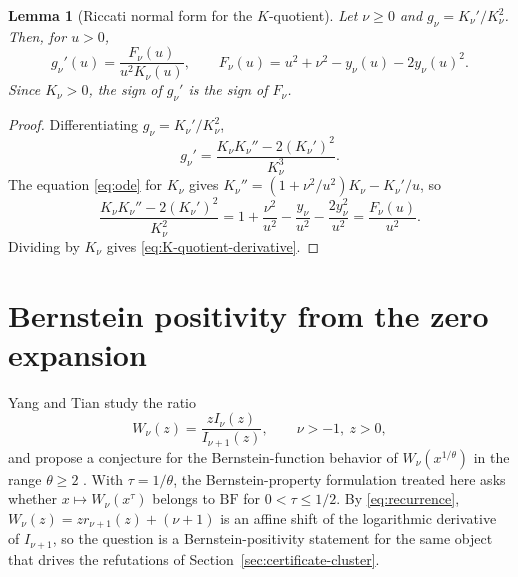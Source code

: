 \documentclass[preprint,12pt]{elsarticle}
\theoremstyle{plain}
\newtheorem{lemma}[theorem]{Lemma}
\theoremstyle{definition}
\theoremstyle{remark}
\newcommand{\BF}{\mathrm{BF}}
\begin{document}
\begin{lemma}[Riccati normal form for the \(K\)-quotient]\label{lem:riccati-K}
Let \(\nu\ge0\) and \(g_\nu=K_\nu'/K_\nu^2\). Then, for \(u>0\),
\begin{equation}\label{eq:K-quotient-derivative}
g_\nu'(u)=\frac{F_\nu(u)}{u^2K_\nu(u)},
\qquad
F_\nu(u)=u^2+\nu^2-y_\nu(u)-2y_\nu(u)^2.
\end{equation}
Since \(K_\nu>0\), the sign of \(g_\nu'\) is the sign of \(F_\nu\).
\end{lemma}
\begin{proof}
Differentiating \(g_\nu=K_\nu'/K_\nu^2\),
\begin{equation}
g_\nu'=\frac{K_\nu K_\nu''-2(K_\nu')^2}{K_\nu^3}.
\end{equation}
The equation \eqref{eq:ode} for \(K_\nu\) gives
\(K_\nu''=(1+\nu^2/u^2)K_\nu-K_\nu'/u\), so
\begin{equation}
\frac{K_\nu K_\nu''-2(K_\nu')^2}{K_\nu^2}
=1+\frac{\nu^2}{u^2}-\frac{y_\nu}{u^2}-\frac{2y_\nu^2}{u^2}
=\frac{F_\nu(u)}{u^2}.
\end{equation}
Dividing by \(K_\nu\) gives \eqref{eq:K-quotient-derivative}.
\end{proof}

\section{Bernstein positivity from the zero expansion}
\label{sec:bernstein-positivity}

Yang and Tian \cite{yang-tian} study the ratio
\begin{equation}
W_\nu(z)=\frac{zI_\nu(z)}{I_{\nu+1}(z)},\qquad \nu>-1,\ z>0,
\end{equation}
and propose a conjecture for the Bernstein-function behavior of
\(W_\nu(x^{1/\theta})\) in the range \(\theta\ge2\)
\cite[Conjecture~3]{yang-tian}. With \(\tau=1/\theta\), the
Bernstein-property formulation treated here asks whether
\(x\mapsto W_\nu(x^\tau)\) belongs to \(\BF\) for \(0<\tau\le1/2\). By
\eqref{eq:recurrence}, \(W_\nu(z)=zr_{\nu+1}(z)+(\nu+1)\) is an affine shift
of the logarithmic derivative of \(I_{\nu+1}\), so the question is a
Bernstein-positivity statement for the same object that drives the
refutations of Section~\ref{sec:certificate-cluster}.
\end{document}
